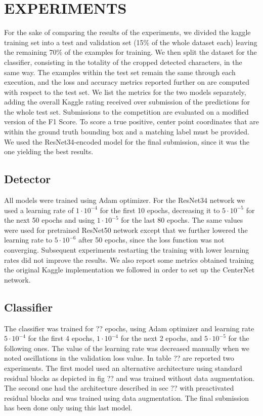 \section{EXPERIMENTS}
\label{sec:experiments}

For the sake of comparing the results of the experiments, we divided the kaggle training set into a test and validation set (15\% of the whole dataset each) leaving the remaining 70\% of the examples for training. We then split the dataset for the classifier, consisting in the totality of the cropped detected characters, in the same way. The examples within the test set remain the same through each execution, and the loss and accuracy metrics reported further on are computed with respect to the test set. We list the metrics for the two models separately, adding the overall Kaggle rating received over submission of the predictions for the whole test set. Submissions to the competition are evaluated on a modified version of the F1 Score. To score a true positive, center point coordinates that are within the ground truth bounding box and a matching label must be provided. We used the ResNet34-encoded model for the final submission, since it was the one yielding the best results.

\subsection{Detector}
\label{ssec:detectorexp}

All models were trained using Adam optimizer. For the ResNet34 network we used a learning rate of $1 \cdot 10^{-4}$ for the first 10 epochs, decreasing it to $5 \cdot 10^{-5}$ for the next 50 epochs and using $1 \cdot 10^{-5}$ for the last 80 epochs. The same values were used for pretrained ResNet50 network except that we further lowered the learning rate to $5 \cdot 10^{-6}$ after 50 epochs, since the loss function was not converging. Subsequent experiments restarting the training with lower learning rates did not improve the results. We also report some metrics obtained training the original Kaggle implementation we followed in order to set up the CenterNet network.

\subsection{Classifier}
\label{ssec:classifierexp}

The classifier was trained for ?? epochs, using Adam optimizer and learning rate $5 \cdot 10^{-4}$ for the first 4 epochs, $1 \cdot 10^{-4}$ for the next 2 epochs, and $5 \cdot 10^{-5}$ for the following ones. The value of the learning rate was decreased manually when we noted oscillations in the validation loss value. In table ?? are reported two experiments. The first model used an alternative architecture using standard residual blocks as depicted in fig ?? and was trained without data augmentation. The second one had the architecture described in sec ?? with preactivated residual blocks and was trained using data augmentation. The final submission has been done only using this last model.

